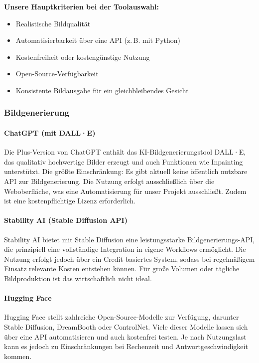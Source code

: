 \documentclass[a4paper,12pt]{article}
\begin{document}
\textbf{Unsere Hauptkriterien bei der Toolauswahl:}
\begin{itemize}
    \item Realistische Bildqualität
    \item Automatisierbarkeit über eine API (z.\,B. mit Python)
    \item Kostenfreiheit oder kostengünstige Nutzung
    \item Open-Source-Verfügbarkeit
    \item Konsistente Bildausgabe für ein gleichbleibendes Gesicht
\end{itemize}

\subsubsection{Bildgenerierung}

\paragraph{ChatGPT (mit DALL·E)}
Die Plus-Version von ChatGPT enthält das KI-Bildgenerierungstool DALL·E, das qualitativ hochwertige Bilder erzeugt und auch Funktionen wie Inpainting unterstützt. Die größte Einschränkung: Es gibt aktuell keine öffentlich nutzbare API zur Bildgenerierung. Die Nutzung erfolgt ausschließlich über die Weboberfläche, was eine Automatisierung für unser Projekt ausschließt. Zudem ist eine kostenpflichtige Lizenz erforderlich.

\paragraph{Stability AI (Stable Diffusion API)}
Stability AI bietet mit Stable Diffusion eine leistungsstarke Bildgenerierungs-API, die prinzipiell eine vollständige Integration in eigene Workflows ermöglicht. Die Nutzung erfolgt jedoch über ein Credit-basiertes System, sodass bei regelmäßigem Einsatz relevante Kosten entstehen können. Für große Volumen oder tägliche Bildproduktion ist das wirtschaftlich nicht ideal.

\paragraph{Hugging Face}
Hugging Face stellt zahlreiche Open-Source-Modelle zur Verfügung, darunter Stable Diffusion, DreamBooth oder ControlNet. Viele dieser Modelle lassen sich über eine API automatisieren und auch kostenfrei testen. Je nach Nutzungslast kann es jedoch zu Einschränkungen bei Rechenzeit und Antwortgeschwindigkeit kommen.
\end{document}
